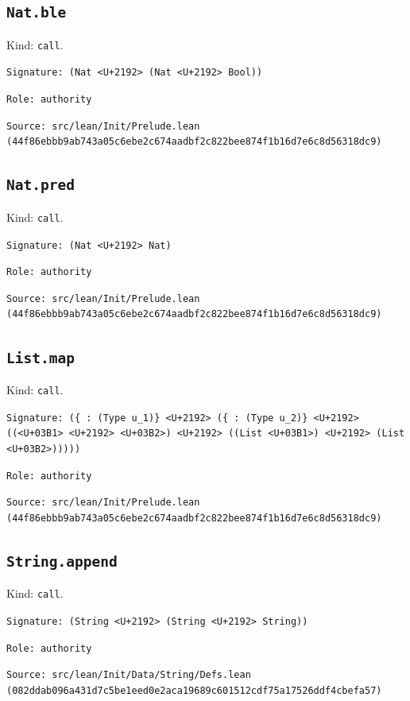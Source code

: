 \documentclass[11pt]{article}
\begin{document}
\subsection*{\texttt{Nat.ble}}
\noindent Kind: \texttt{call}.\par
\noindent \texttt{Signature: (Nat <U+2192> (Nat <U+2192> Bool))}\par
\noindent \texttt{Role: authority}\par
\noindent \texttt{Source: src/lean/Init/Prelude.lean (44f86ebbb9ab743a05c6ebe2c674aadbf2c822bee874f1b16d7e6c8d56318dc9)}\par
\subsection*{\texttt{Nat.pred}}
\noindent Kind: \texttt{call}.\par
\noindent \texttt{Signature: (Nat <U+2192> Nat)}\par
\noindent \texttt{Role: authority}\par
\noindent \texttt{Source: src/lean/Init/Prelude.lean (44f86ebbb9ab743a05c6ebe2c674aadbf2c822bee874f1b16d7e6c8d56318dc9)}\par
\subsection*{\texttt{List.map}}
\noindent Kind: \texttt{call}.\par
\noindent \texttt{Signature: (\{<U+03B1> : (Type u\_1)\} <U+2192> (\{<U+03B2> : (Type u\_2)\} <U+2192> ((<U+03B1> <U+2192> <U+03B2>) <U+2192> ((List <U+03B1>) <U+2192> (List <U+03B2>)))))}\par
\noindent \texttt{Role: authority}\par
\noindent \texttt{Source: src/lean/Init/Prelude.lean (44f86ebbb9ab743a05c6ebe2c674aadbf2c822bee874f1b16d7e6c8d56318dc9)}\par
\subsection*{\texttt{String.append}}
\noindent Kind: \texttt{call}.\par
\noindent \texttt{Signature: (String <U+2192> (String <U+2192> String))}\par
\noindent \texttt{Role: authority}\par
\noindent \texttt{Source: src/lean/Init/Data/String/Defs.lean (082ddab096a431d7c5be1eed0e2aca19689c601512cdf75a17526ddf4cbefa57)}\par
\end{document}
